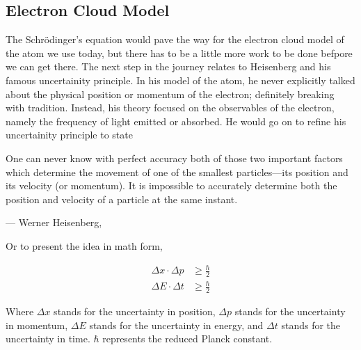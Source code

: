 \subsection{Electron Cloud Model}

The Schrödinger's equation would pave the way for the electron cloud model of the atom we use today, but there has to be a little more work to be done befpore we can get there.
The next step in the journey relates to Heisenberg and his famous uncertainity principle.
In his model of the atom, he  never explicitly talked about the physical position or momentum of the electron; definitely breaking with tradition. Instead, his theory focused on the observables of the electron, namely the frequency of light emitted or absorbed. He would go on to refine his uncertainity principle to state

One can never know with perfect accuracy both of those two important factors which determine the movement of one of the smallest particles—its position and its velocity (or momentum). It is impossible to accurately determine both the position and velocity of a particle at the same instant.

\begin{flushright}--- Werner Heisenberg,\end{flushright}

Or to present the idea in math form,

\begin{align}
  \Delta x \cdot \Delta p &\geq \frac{\hbar}{2} \\
  \Delta E \cdot \Delta t &\geq \frac{\hbar}{2}
\end{align}

Where $\Delta x$ stands for the uncertainty in position, $\Delta p$ stands for the uncertainty in momentum, $\Delta E$ stands for the uncertainty in energy, and $\Delta t$ stands for the uncertainty in time. $\hbar$ represents the reduced Planck constant.